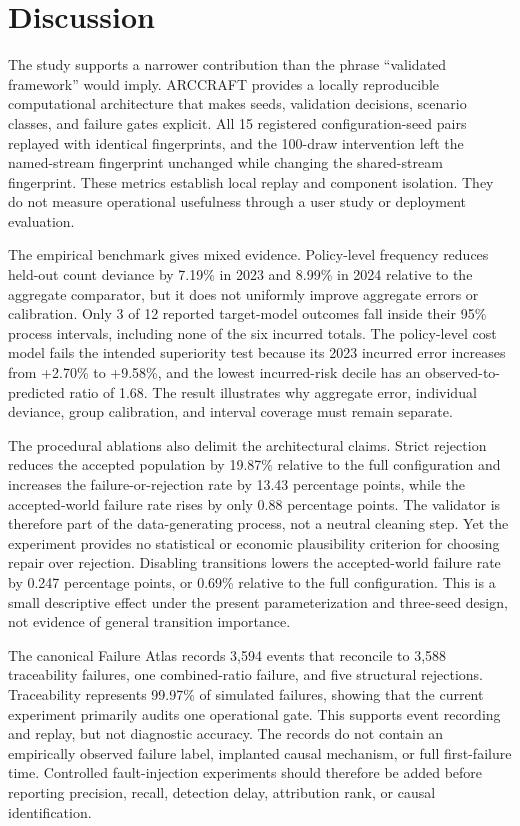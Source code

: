 \FloatBarrier
\section{Discussion}\label{sec:discussion}

The study supports a narrower contribution than the phrase “validated framework” would imply. ARCCRAFT provides a locally reproducible computational architecture that makes seeds, validation decisions, scenario classes, and failure gates explicit. All 15 registered configuration-seed pairs replayed with identical fingerprints, and the 100-draw intervention left the named-stream fingerprint unchanged while changing the shared-stream fingerprint. These metrics establish local replay and component isolation. They do not measure operational usefulness through a user study or deployment evaluation.

The empirical benchmark gives mixed evidence. Policy-level frequency reduces held-out count deviance by 7.19\% in 2023 and 8.99\% in 2024 relative to the aggregate comparator, but it does not uniformly improve aggregate errors or calibration. Only 3 of 12 reported target-model outcomes fall inside their 95\% process intervals, including none of the six incurred totals. The policy-level cost model fails the intended superiority test because its 2023 incurred error increases from +2.70\% to +9.58\%, and the lowest incurred-risk decile has an observed-to-predicted ratio of 1.68. The result illustrates why aggregate error, individual deviance, group calibration, and interval coverage must remain separate.

The procedural ablations also delimit the architectural claims. Strict rejection reduces the accepted population by 19.87\% relative to the full configuration and increases the failure-or-rejection rate by 13.43 percentage points, while the accepted-world failure rate rises by only 0.88 percentage points. The validator is therefore part of the data-generating process, not a neutral cleaning step. Yet the experiment provides no statistical or economic plausibility criterion for choosing repair over rejection. Disabling transitions lowers the accepted-world failure rate by 0.247 percentage points, or 0.69\% relative to the full configuration. This is a small descriptive effect under the present parameterization and three-seed design, not evidence of general transition importance.

The canonical Failure Atlas records 3,594 events that reconcile to 3,588 traceability failures, one combined-ratio failure, and five structural rejections. Traceability represents 99.97\% of simulated failures, showing that the current experiment primarily audits one operational gate. This supports event recording and replay, but not diagnostic accuracy. The records do not contain an empirically observed failure label, implanted causal mechanism, or full first-failure time. Controlled fault-injection experiments should therefore be added before reporting precision, recall, detection delay, attribution rank, or causal identification.

